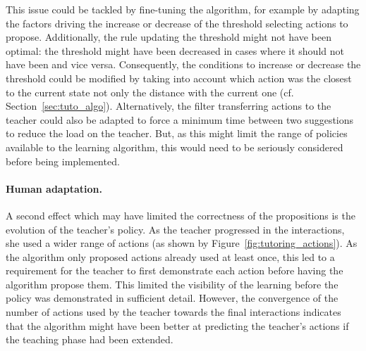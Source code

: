 This issue could be tackled by fine-tuning the algorithm, for example by adapting the factors driving the increase or decrease of the threshold selecting actions to propose. Additionally, the rule updating the threshold might not have been optimal: the threshold might have been decreased in cases where it should not have been and vice versa. Consequently, the conditions to increase or decrease the threshold could be modified by taking into account which action was the closest to the current state not only the distance with the current one (cf. Section~\ref{sec:tuto_algo}).
Alternatively, the filter transferring actions to the teacher could also be adapted to force a minimum time between two suggestions to reduce the load on the teacher. But, as this might limit the range of policies available to the learning algorithm, this would need to be seriously considered before being implemented.

\paragraph{Human adaptation.}
A second effect which may have limited the correctness of the propositions is the evolution of the teacher's policy. As the teacher progressed in the interactions, she used a wider range of actions (as shown by Figure~\ref{fig:tutoring_actions}). As the algorithm only proposed actions already used at least once, this led to a requirement for the teacher to first demonstrate each action before having the algorithm propose them. This limited the visibility of the learning before the policy was demonstrated in sufficient detail. However, the convergence of the number of actions used by the teacher towards the final interactions indicates that the algorithm might have been better at predicting the teacher's actions if the teaching phase had been extended.

